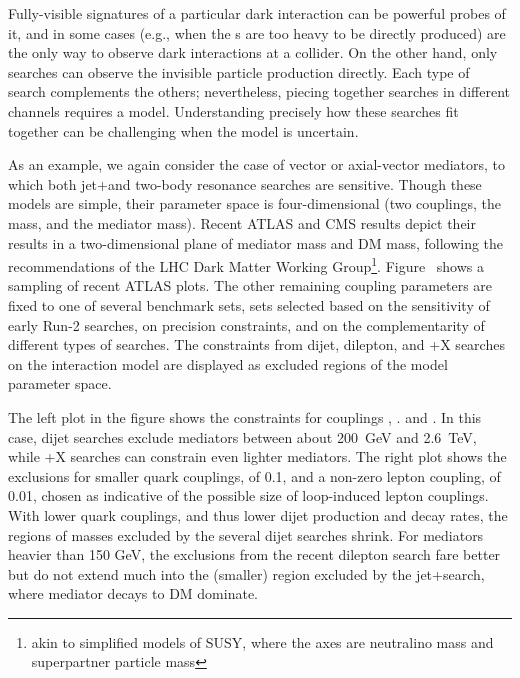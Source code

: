 Fully-visible signatures of a particular dark interaction can be powerful probes of it, and in some cases (e.g., when the {\IP}s are too heavy to be directly produced) are the only way to observe dark interactions at a collider. On the other hand, only \MET searches can observe the invisible particle production directly.
Each type of search complements the others; nevertheless, piecing together searches in different channels requires a model. Understanding precisely how these searches fit together can be challenging when the model is uncertain.

As an example, we again consider the case of vector or axial-vector mediators, to which both jet+\MET and two-body resonance searches are sensitive.
Though these models are simple, their parameter space is four-dimensional (two couplings, the \IP mass, and the mediator mass).
Recent ATLAS and CMS results depict their results in a two-dimensional plane of mediator mass and DM mass, following the recommendations of the LHC Dark Matter Working Group\footnote{akin to simplified models of SUSY, where the axes are neutralino mass and superpartner particle mass}.
Figure~\label{fig:sensitivityComparison} shows a sampling of recent ATLAS plots.
The other remaining coupling parameters are fixed to one of several benchmark sets, sets selected based on the sensitivity of early Run-2 searches, on precision constraints, and on the complementarity of different types of searches.
The constraints from dijet, dilepton, and \MET+X searches on the interaction model are displayed as excluded regions of the model parameter space.

The left plot in the figure shows the constraints for couplings , . and .
In this case, dijet searches exclude mediators between about 200~GeV and 2.6~TeV, while \MET+X searches can constrain even lighter mediators.
The right plot shows the exclusions for smaller quark couplings, \gq of 0.1, and a non-zero lepton coupling, \gl of 0.01, chosen as indicative of the possible size of loop-induced lepton couplings.
With lower quark couplings, and thus lower dijet production and decay rates, the regions of masses excluded by the several dijet searches shrink.
For mediators heavier than 150 GeV, the exclusions from the recent dilepton search fare better but do not extend much into the (smaller) region excluded by the jet+\MET search, where mediator decays to DM dominate.

